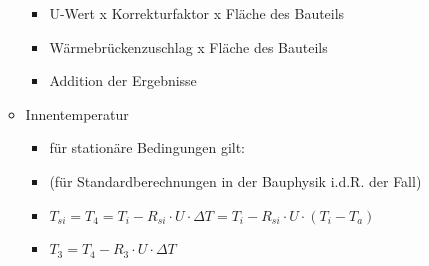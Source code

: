 \documentclass[fleqn,twoside,dvipsnames]{article}
\begin{document}
\begin{itemize}
\begin{itemize}
                                \begin{itemize}
                                    \item U-Wert x Korrekturfaktor x Fläche des Bauteils
                                    \item Wärmebrückenzuschlag x Fläche des Bauteils
                                    \item Addition der Ergebnisse
                                \end{itemize}
                            \item Innentemperatur
                                \begin{itemize}
                                    \item für stationäre Bedingungen gilt:
                                    \item (für Standardberechnungen in der Bauphysik i.d.R. der Fall)
                                    \item $T_{s i}=T_4=T_i-R_{s i} \cdot U \cdot \Delta T=T_i-R_{s i} \cdot U \cdot\left(T_i-T_a\right)$
                                    \item $T_3=T_4-R_3 \cdot U \cdot \Delta T $
                                \end{itemize}
                        \end{itemize}
                \end{itemize}
\end{document}
